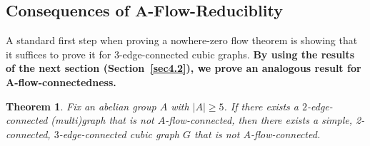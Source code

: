 \documentclass[a4paper,12pt]{article}
\theoremstyle{plain}
\newtheorem{theorem}{Theorem}[section]
\theoremstyle{definition}
\renewcommand\ge\geqslant
\begin{document}
\subsection{Consequences of \texorpdfstring{$\bm{A}$}{A}-Flow-Reduciblity}
\label{sec4.1}

A standard first step when proving a nowhere-zero flow theorem is showing that it suffices to prove it for $3$-edge-connected cubic graphs. \textbf{By using the results of the next section 
(Section~\ref{sec4.2}), we prove an analogous result for $\bm{A}$-flow-connectedness.}

\begin{theorem}\label{reduce-to-cubic-lem}
Fix an abelian group $A$ with $|A|\ge 5$. If there exists a $2$-edge-connected (multi)graph that is not $A$-flow-connected, then there exists a simple, 2-connected, $3$-edge-connected cubic graph $G$ that is not $A$-flow-connected.
\end{theorem}
\end{document}
